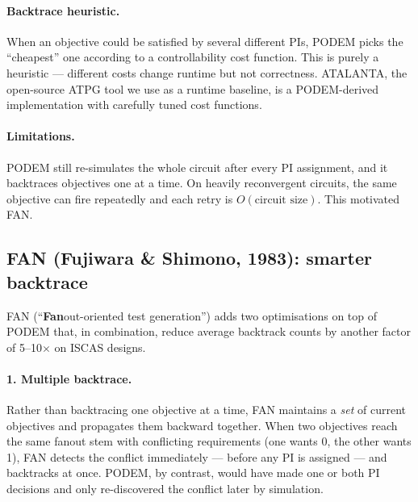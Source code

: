 \documentclass[11pt,a4paper]{article}
\begin{document}
\paragraph{Backtrace heuristic.} When an objective could be satisfied
by several different PIs, PODEM picks the ``cheapest'' one according
to a controllability cost function. This is purely a heuristic ---
different costs change runtime but not correctness. ATALANTA, the
open-source ATPG tool we use as a runtime baseline, is a
PODEM-derived implementation with carefully tuned cost functions.

\paragraph{Limitations.} PODEM still re-simulates the whole circuit
after every PI assignment, and it backtraces objectives one at a time.
On heavily reconvergent circuits, the same objective can fire
repeatedly and each retry is $O(\text{circuit size})$. This motivated
FAN.

\subsection{FAN (Fujiwara \& Shimono, 1983): smarter backtrace}

FAN (``\textbf{Fan}out-oriented test generation'') adds two
optimisations on top of PODEM that, in combination, reduce average
backtrack counts by another factor of 5--10$\times$ on ISCAS designs.

\paragraph{1. Multiple backtrace.} Rather than backtracing one
objective at a time, FAN maintains a \emph{set} of current objectives
and propagates them backward together. When two objectives reach the
same fanout stem with conflicting requirements (one wants 0, the other
wants 1), FAN detects the conflict immediately --- before any PI is
assigned --- and backtracks at once. PODEM, by contrast, would have
made one or both PI decisions and only re-discovered the conflict
later by simulation.
\end{document}
